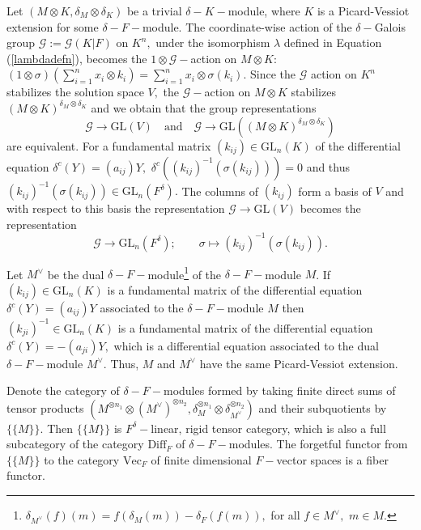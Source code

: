 \documentclass[preprint, 11pt]{amsart}
\theoremstyle{corollary}
\theoremstyle{remark}
\theoremstyle{proposition}
\numberwithin{equation}{subsection}
\begin{document}
Let $(M\otimes K, \delta_M\otimes\delta_K)$ be a trivial  $\delta-K-$module, where $K$ is a Picard-Vessiot extension for some $\delta-F-$module. The coordinate-wise action of the $\delta-$Galois group $\mathscr G:= \mathscr G(K|F)$ on $K^n,$ under the isomorphism $\lambda$ defined in Equation (\ref{lambdadefn}), becomes  the $1\otimes \mathscr G-$action on $M\otimes K:$ $(1\otimes \sigma)(\sum^n_{i=1} x_i\otimes k_i)=\sum^n_{i=1} x_i\otimes \sigma(k_i).$ Since the $\mathscr G$ action on $K^n$ stabilizes  the solution space $V,$ the $\mathscr G-$action on $M\otimes K$ stabilizes  $(M\otimes K)^{\delta_M\otimes \delta_K}$ and we obtain that the group representations  \begin{equation*} \mathscr G\to \mathrm{GL}(V) \quad \text{and}\quad \mathscr G\to \mathrm{GL}((M\otimes K)^{\delta_M\otimes \delta_K})\end{equation*} 
are equivalent. For a fundamental matrix $(k_{ij})\in \mathrm{GL}_n(K)$ of the differential equation $\delta^c(Y)=(a_{ij})Y,$  $\delta^c\left((k_{ij})^{-1}(\sigma(k_{ij}))\right)=0$ and thus  $(k_{ij})^{-1}(\sigma(k_{ij}))\in \mathrm{GL}_n(F^{\delta}).$ The columns of $(k_{ij})$ form a basis of $V$ and with respect to this basis the representation $\mathscr G\to \mathrm{GL}(V)$ becomes the  representation  \begin{equation}\label{repcocycle}\mathscr G\to \mathrm{GL}_n(F^{\delta});\qquad \sigma\mapsto (k_{ij})^{-1}(\sigma(k_{ij})).\end{equation}


 Let  $M^{\vee}$ be the dual $\delta-F-$module\footnote{$\delta_{M^{\vee}}(f)(m)=f(\delta_M(m))-\delta_F(f(m)),$ for all $f\in M^{\vee},$ $m\in M.$} of the $\delta-F-$module $M$. If $(k_{ij})\in \mathrm{GL}_n(K)$ is a fundamental matrix of  the differential equation $\delta^c(Y)=(a_{ij})Y$ associated to the $\delta-F-$module $M$ then $(k_{ji})^{-1} \in \mathrm{GL}_n(K)$ is a fundamental matrix of  the differential equation $\delta^c(Y)=-(a_{ji})Y,$  which is a differential equation associated to the dual $\delta-F-$module $M^{\vee}.$ Thus,   $M$ and $M^{\vee}$ have the same Picard-Vessiot extension.
 
  Denote  the category of $\delta-F-$modules formed by taking finite direct sums of  tensor products $(M^{\otimes n_1} \otimes (M^{\vee})^{\otimes n_2}, \delta^{\otimes n_1}_M \otimes \delta^{\otimes n_2}_{M^{\vee}})$ and their subquotients by $\{\{M\}\}.$   Then $\{\{M\}\}$ is $F^{\delta}-$linear, rigid tensor category, which is also a full subcategory of the category $\mathrm{Diff}_F$ of $\delta-F-$modules.  The forgetful functor from $\{\{M\}\}$ to the category $\mathrm{Vec}_F$ of finite dimensional  $F-$vector spaces is a fiber functor.  
\end{document}

